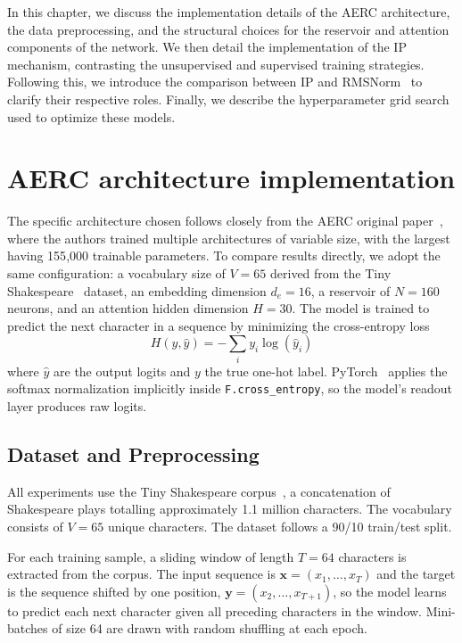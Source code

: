 \documentclass{sapthesis}
\begin{document}
In this chapter, we discuss the implementation details of the AERC architecture, the data preprocessing, and the structural choices for the reservoir and attention components of the network. We then detail the implementation of the IP mechanism, contrasting the unsupervised and supervised training strategies. Following this, we introduce the comparison between IP and RMSNorm~\cite{zhang2019root} to clarify their respective roles. Finally, we describe the hyperparameter grid search used to optimize these models.

\section{AERC architecture implementation}
\label{sec:aerc-impl}
The specific architecture chosen follows closely from the AERC original paper~\cite{koster2024attentionenhancedreservoircomputing}, where the authors trained multiple architectures of variable size, with the largest having 155{,}000 trainable parameters. To compare results directly, we adopt the same configuration: a vocabulary size of $V = 65$ derived from the Tiny Shakespeare~\cite{karpathy2015charRnn} dataset, an embedding dimension $d_e = 16$, a reservoir of $N = 160$ neurons, and an attention hidden dimension $H = 30$.
The model is trained to predict the next character in a sequence by minimizing the cross-entropy loss
\[
  H(y, \hat{y}) = -\sum_i y_i \log(\hat{y}_i)
\]
where $\hat{y}$ are the output logits and $y$ the true one-hot label. PyTorch~\cite{Paszke2019PyTorch} applies the softmax normalization implicitly inside \texttt{F.cross\_entropy}, so the model's readout layer produces raw logits.

\subsection{Dataset and Preprocessing}
All experiments use the Tiny Shakespeare corpus~\cite{karpathy2015charRnn}, a concatenation of Shakespeare plays totalling approximately 1.1 million characters. The vocabulary consists of $V = 65$ unique characters. The dataset follows a 90/10 train/test split.

For each training sample, a sliding window of length $T = 64$ characters is extracted from the corpus. The input sequence is $\mathbf{x} = (x_1, \ldots, x_T)$ and the target is the sequence shifted by one position, $\mathbf{y} = (x_2, \ldots, x_{T+1})$, so the model learns to predict each next character given all preceding characters in the window. Mini-batches of size 64 are drawn with random shuffling at each epoch.
\end{document}
